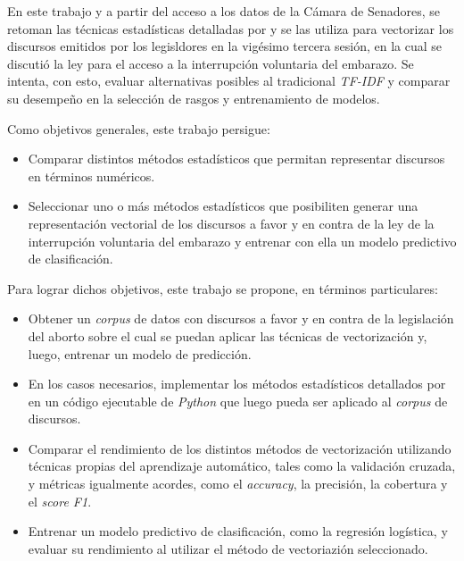 En este trabajo y a partir del acceso a los datos de la C\'amara de Senadores,
se retoman las t\'ecnicas estad\'isticas detalladas por
\citeauthor{monroe2008fightin} y se las utiliza para vectorizar los
discursos emitidos por los legisldores en la vig\'esimo tercera sesi\'on,
en la cual se discuti\'o la ley para el acceso a
la interrupci\'on voluntaria del embarazo.
Se intenta, con esto, evaluar alternativas posibles al tradicional \textit{TF-IDF}
y comparar su desempeño en la selecci\'on de rasgos y entrenamiento de modelos.

Como objetivos generales, este trabajo persigue:

\begin{itemize}
    \item{Comparar distintos m\'etodos estad\'isticos que permitan representar
    discursos en t\'erminos num\'ericos.}
    \item{Seleccionar uno o m\'as m\'etodos estad\'isticos que posibiliten
    generar una representaci\'on vectorial de los discursos a favor y en
    contra de la ley de la interrupci\'on voluntaria del embarazo y entrenar
    con ella un modelo predictivo de clasificaci\'on.}
\end{itemize}

Para lograr dichos objetivos, este trabajo se propone, en t\'erminos
particulares:

\begin{itemize}
    \item{Obtener un \textit{corpus} de datos con discursos a favor y en contra
    de la legislaci\'on del aborto sobre el cual se puedan aplicar las t\'ecnicas de
    vectorizaci\'on y, luego, entrenar un modelo de predicci\'on.}
    \item{En los casos necesarios, implementar los m\'etodos estad\'isticos detallados
    por \cite{monroe2008fightin} en un c\'odigo ejecutable de \textit{Python} que
    luego pueda ser aplicado al \textit{corpus} de discursos.}
    \item{Comparar el rendimiento de los distintos m\'etodos de vectorizaci\'on utilizando
    t\'ecnicas propias del aprendizaje autom\'atico, tales como la validaci\'on
    cruzada, y m\'etricas igualmente acordes, como el \textit{accuracy}, la precisi\'on,
    la cobertura y el \textit{score F1}.}
    \item{Entrenar un modelo predictivo de clasificaci\'on, como la regresi\'on log\'istica,
    y evaluar su rendimiento al utilizar el m\'etodo de vectoriazi\'on seleccionado.}
\end{itemize}

